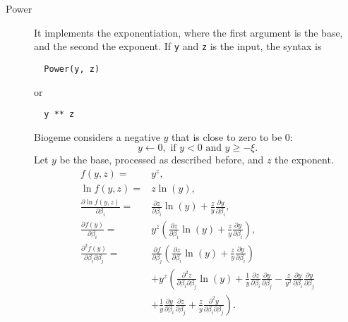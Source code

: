 \documentclass[12pt,a4paper]{article}
\begin{document}
\begin{description}
\item[Power] It implements the exponentiation, where the first argument is the base, and the second the exponent. 
    If \lstinline+y+ and \lstinline+z+ is the input, the syntax is
\begin{lstlisting}
  Power(y, z)
\end{lstlisting}
or
\begin{lstlisting}
  y ** z
\end{lstlisting}
  Biogeme considers a negative $y$ that is close to zero to be 0:
  \[
  y \leftarrow 0, \text{ if } y < 0 \text{ and } y \geq -\xi.
  \]
Let $y$ be the base, processed as described before, and $z$ the exponent.
      \begin{align*}
    f(y, z)=& y^z, \\ 
    \ln f(y, z) =& z \ln(y), \\
    \frac{\partial \ln f(y, z)}{\partial \beta_i} =& \frac{\partial z}{\partial \beta_i} \ln(y) + \frac{z}{y} \frac{\partial y}{\partial \beta_i}, \\
    \frac{\partial f(y)}{\partial \beta_i} =& y^z \left(\frac{\partial z}{\partial \beta_i} \ln(y) + \frac{z}{y} \frac{\partial y}{\partial \beta_i}\right), \\
    \frac{\partial^2 f(y)}{\partial \beta_i \partial \beta_j} =& \frac{\partial f}{\partial \beta_j} \left(\frac{\partial z}{\partial \beta_i} \ln(y) + \frac{z}{y} \frac{\partial y}{\partial \beta_i}\right) \\
    & +y^z \left(
    \frac{\partial^2 z}{\partial \beta_i \partial \beta_j}\ln(y)
    + \frac{1}{y}\frac{\partial z}{\partial \beta_i}\frac{\partial y}{\partial \beta_j}
    - \frac{z}{y^2}\frac{\partial y}{\partial \beta_i}\frac{\partial y}{\partial \beta_j}\right.\\
    &\left.
    +\frac{1}{y}\frac{\partial y}{\partial \beta_i}\frac{\partial z}{\partial \beta_j}
    +\frac{z}{y}\frac{\partial^2 y}{\partial \beta_i\partial \beta_j}
    \right).
     \end{align*}
  

\end{description}
\end{document}
